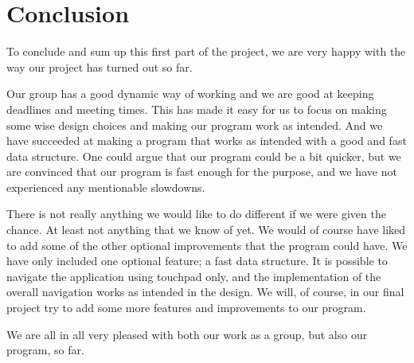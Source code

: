 \documentclass[a4paper,11pt]{article}
\begin{document}
\pagebreak
\section{Conclusion} %
\label{sec:Conclusion}
To conclude and sum up this first part of the project, we are very happy with the way our project has turned out so far. 

Our group has a good dynamic way of working and we are good at keeping deadlines and meeting times. This has made it easy for us to focus on making some
wise design choices and making our program work as intended. And we have succeeded at making a program that works as intended with a good and fast data structure. One could argue that our program could be a bit quicker, but we are convinced that our program is fast enough for the purpose, and we have not experienced any mentionable slowdowns. 

There is not really anything we would like to do different if we were given the chance. At least not anything that we know of yet. We would of course have liked to add some of the other optional improvements that the program could have. We have only included one optional feature; a fast data structure.
It is possible to navigate the application using touchpad only, and the implementation of the overall navigation works as intended in the design.
We will, of course, in our final project try to add some more features and improvements to our program.

We are all in all very pleased with both our work as a group, but also our program, so far.
\end{document}
